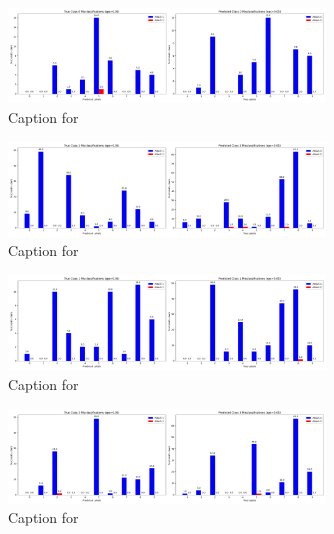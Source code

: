 \documentclass{article}
\begin{document}
\begin{figure}[!htbp]
\centering
\includegraphics[width=0.75\textwidth]{combined_class_boundary_pgd/combined_class_0_misclassifications_eps_0.05.png}
\caption{Caption for }
\label{fig:combined_class_0_misclassifications_eps_0.05.png}
\end{figure}

\begin{figure}[!htbp]
\centering
\includegraphics[width=0.75\textwidth]{combined_class_boundary_pgd/combined_class_2_misclassifications_eps_0.05.png}
\caption{Caption for }
\label{fig:combined_class_2_misclassifications_eps_0.05.png}
\end{figure}

\begin{figure}[!htbp]
\centering
\includegraphics[width=0.75\textwidth]{combined_class_boundary_pgd/combined_class_1_misclassifications_eps_0.05.png}
\caption{Caption for }
\label{fig:combined_class_1_misclassifications_eps_0.05.png}
\end{figure}


\begin{figure}[!htbp]
\centering
\includegraphics[width=0.75\textwidth]{combined_class_boundary_pgd/combined_class_3_misclassifications_eps_0.05.png}
\caption{Caption for }
\label{fig:combined_class_3_misclassifications_eps_0.05.png}
\end{figure}
\end{document}
